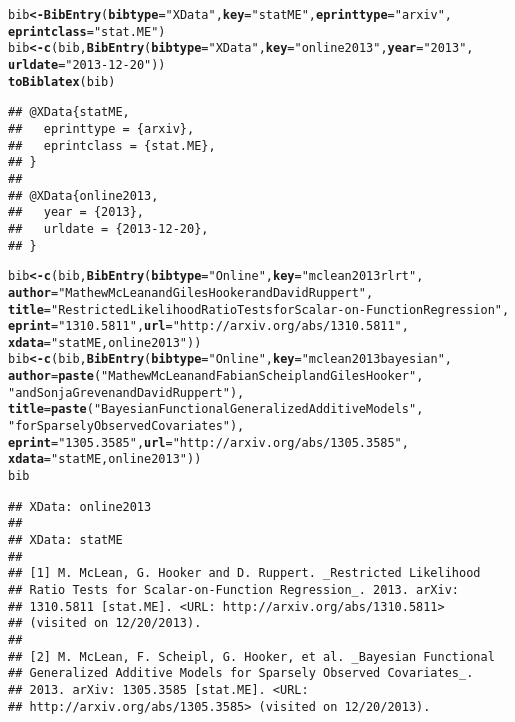 \documentclass[article]{jss}\usepackage[]{graphicx}\usepackage[]{color}
\makeatletter
\newcommand{\hlstr}[1]{\textcolor[rgb]{0.125,0.125,1}{#1}}%
\newcommand{\hlstd}[1]{\textcolor[rgb]{0.251,0.251,0.282}{#1}}%
\newcommand{\hlkwb}[1]{\textcolor[rgb]{0.439,0.251,1}{\textbf{#1}}}%
\newcommand{\hlkwc}[1]{\textcolor[rgb]{0.529,0,0.184}{\textbf{#1}}}%
\newcommand{\hlkwd}[1]{\textcolor[rgb]{0.251,0.251,0.282}{\textbf{#1}}}%
\newenvironment{kframe}{%
 \def\at@end@of@kframe{}%
 \ifinner\ifhmode%
  \def\at@end@of@kframe{\end{minipage}}%
  \begin{minipage}{\columnwidth}%
 \fi\fi%
 \def\FrameCommand##1{\hskip\@totalleftmargin \hskip-\fboxsep
 \colorbox{shadecolor}{##1}\hskip-\fboxsep
     \hskip-\linewidth \hskip-\@totalleftmargin \hskip\columnwidth}%
 \MakeFramed {\advance\hsize-\width
   \@totalleftmargin\z@ \linewidth\hsize
   \@setminipage}}%
 {\par\unskip\endMakeFramed%
 \at@end@of@kframe}
\newenvironment{knitrout}{}{} %
\makeatother
\begin{document}
\begin{knitrout}
\color{fgcolor}\begin{kframe}
\begin{alltt}
\hlstd{bib} \hlkwb{<-} \hlkwd{BibEntry}\hlstd{(}\hlkwc{bibtype}\hlstd{=}\hlstr{"XData"}\hlstd{,} \hlkwc{key} \hlstd{=} \hlstr{"statME"}\hlstd{,} \hlkwc{eprinttype} \hlstd{=} \hlstr{"arxiv"}\hlstd{,}
                \hlkwc{eprintclass} \hlstd{=} \hlstr{"stat.ME"}\hlstd{)}
\hlstd{bib} \hlkwb{<-} \hlkwd{c}\hlstd{(bib,} \hlkwd{BibEntry}\hlstd{(}\hlkwc{bibtype}\hlstd{=}\hlstr{"XData"}\hlstd{,} \hlkwc{key} \hlstd{=} \hlstr{"online2013"}\hlstd{,} \hlkwc{year} \hlstd{=} \hlstr{"2013"}\hlstd{,}
                       \hlkwc{urldate} \hlstd{=} \hlstr{"2013-12-20"}\hlstd{))}
\hlkwd{toBiblatex}\hlstd{(bib)}
\end{alltt}
\begin{verbatim}
## @XData{statME,
##   eprinttype = {arxiv},
##   eprintclass = {stat.ME},
## }
## 
## @XData{online2013,
##   year = {2013},
##   urldate = {2013-12-20},
## }
\end{verbatim}
\begin{alltt}
\hlstd{bib} \hlkwb{<-} \hlkwd{c}\hlstd{(bib,} \hlkwd{BibEntry}\hlstd{(}\hlkwc{bibtype}\hlstd{=}\hlstr{"Online"}\hlstd{,} \hlkwc{key}\hlstd{=}\hlstr{"mclean2013rlrt"}\hlstd{,}
  \hlkwc{author} \hlstd{=} \hlstr{"Mathew McLean and Giles Hooker and David Ruppert"}\hlstd{,}
  \hlkwc{title} \hlstd{=} \hlstr{"Restricted Likelihood Ratio Tests for Scalar-on-Function Regression"}\hlstd{,}
  \hlkwc{eprint} \hlstd{=} \hlstr{"1310.5811"}\hlstd{,} \hlkwc{url} \hlstd{=} \hlstr{"http://arxiv.org/abs/1310.5811"}\hlstd{,}
  \hlkwc{xdata} \hlstd{=} \hlstr{"statME,online2013"}\hlstd{))}
\hlstd{bib} \hlkwb{<-} \hlkwd{c}\hlstd{(bib,} \hlkwd{BibEntry}\hlstd{(}\hlkwc{bibtype}\hlstd{=}\hlstr{"Online"}\hlstd{,} \hlkwc{key}\hlstd{=}\hlstr{"mclean2013bayesian"}\hlstd{,}
  \hlkwc{author} \hlstd{=} \hlkwd{paste}\hlstd{(}\hlstr{"Mathew McLean and Fabian Scheipl and Giles Hooker"}\hlstd{,}
                \hlstr{"and Sonja Greven and David Ruppert"}\hlstd{),}
  \hlkwc{title} \hlstd{=} \hlkwd{paste}\hlstd{(}\hlstr{"Bayesian Functional Generalized Additive Models"}\hlstd{,}
               \hlstr{"for Sparsely Observed Covariates"}\hlstd{),}
  \hlkwc{eprint} \hlstd{=} \hlstr{"1305.3585"}\hlstd{,} \hlkwc{url} \hlstd{=} \hlstr{"http://arxiv.org/abs/1305.3585"}\hlstd{,}
  \hlkwc{xdata} \hlstd{=} \hlstr{"statME,online2013"}\hlstd{))}
\hlstd{bib}
\end{alltt}
\begin{verbatim}
## XData: online2013
## 
## XData: statME
## 
## [1] M. McLean, G. Hooker and D. Ruppert. _Restricted Likelihood
## Ratio Tests for Scalar-on-Function Regression_. 2013. arXiv:
## 1310.5811 [stat.ME]. <URL: http://arxiv.org/abs/1310.5811>
## (visited on 12/20/2013).
## 
## [2] M. McLean, F. Scheipl, G. Hooker, et al. _Bayesian Functional
## Generalized Additive Models for Sparsely Observed Covariates_.
## 2013. arXiv: 1305.3585 [stat.ME]. <URL:
## http://arxiv.org/abs/1305.3585> (visited on 12/20/2013).
\end{verbatim}
\end{kframe}
\end{knitrout}
\end{document}
